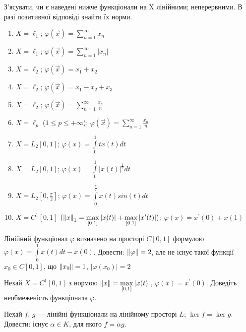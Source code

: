\begin{exercise}
    З'ясувати, чи є наведені нижче функціонали на X лінійними; 
    неперервними. В разі позитивної відповіді знайти їх норми.
    \begin{enumerate}[label=\ukr*)]
        \item $X = \ell_1$; $\varphi(\vec{x}) = \sum\limits_{n=1}^{\infty} x_n $
        \item $X = \ell_1$; $\varphi(\vec{x}) = \sum\limits_{n=1}^{\infty} |x_n| $
        \item $X = \ell_2$; $\varphi(\vec{x}) = x_1 + x_2 $
        \item $X = \ell_2$; $\varphi(\vec{x}) = x_1 - x_2 + x_3$
        \item $X = \ell_2$; $\varphi(\vec{x}) = \sum\limits_{n=1}^{\infty} \frac{x_n}{n}$
        \item $X = \ell_p$ ($1 \leq p \leq +\infty$); $\varphi(\vec{x}) = 
        \sum\limits_{n=1}^{\infty} \frac{x_n}{n}$
        \item $X = L_2[0,1]$; $\varphi(x) = \int\limits_0^1 tx(t)dt$
        \item $X = L_2[0,1]$; $\varphi(x) = \int\limits_0^1 |x(t)|^{\frac{1}{2}}dt$
        \item $X = L_2[0,\frac{\pi}{2}]$; 
        $\varphi(x) = \int\limits_0^{\frac{\pi}{2}} x(t)sin(t)dt$
        \item $X = C^1[0,1]$ $(\left\lVert x\right\rVert_1 = \max\limits_{[0,1]}|x(t)| + 
        \max\limits_{[0,1]}|x^{\prime}(t)|)$; $\varphi(x) = x^{\prime}(0) + x(1)$
    \end{enumerate}
\end{exercise}

\begin{exercise}
    Лінійний функціонал $\varphi$ визначено на просторі $C[0, 1]$ формулою 
    $\varphi(x) = \int\limits_0^1 x(t)dt - x(0)$. Довести: $\left\lVert\varphi\right\rVert = 2$, 
    але не існує такої функції $x_0 \in C[0, 1]$, що $\left\lVert x_0\right\rVert = 1$, $|\varphi(x_0)| = 2$
\end{exercise}

\begin{exercise}
    Нехай $X = C^1[0, 1]$ з нормою $\left\lVert x\right\rVert = \max\limits_{[0, 1]}|x(t)|$, 
    $\varphi(x) = x^\prime(0)$. Доведіть необмеженість функціонала $\varphi$.
\end{exercise}

\begin{exercise}
    Нехай $f$, $g$ --- лінійні функціонали на лінійному просторі $L$; $\ker f = \ker g$. 
    Довести: існує $\alpha \in K$, для якого $f = \alpha g$.
\end{exercise}

